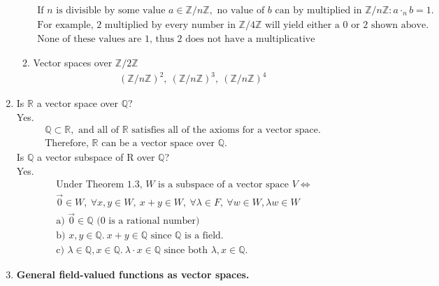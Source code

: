 \documentclass{article}
\begin{document}
\begin{enumerate}
\begin{enumerate}
\begin{gather*}
            \textrm{If } n \textrm{ is divisible by some value } a \in \mathbb{Z}/n\mathbb{Z}, \textrm{ no value of } b \textrm{ can by multiplied in } \mathbb{Z}/n\mathbb{Z} : a \cdot_n b = 1.
        \end{gather*}
        \begin{gather*}
            \textrm{For example, 2 multiplied by every number in } \mathbb{Z}/4\mathbb{Z} \textrm{ will yield either a 0 or 2 shown above.} \\
            \textrm{None of these values are 1, thus 2 does not have a multiplicative inverse.}
        \end{gather*}
        \item Vector spaces over $\mathbb{Z} / 2\mathbb{Z}$
        \begin{gather*}
            (\mathbb{Z}/n\mathbb{Z})^2,\  (\mathbb{Z}/n\mathbb{Z})^3, \ (\mathbb{Z}/n\mathbb{Z})^4
        \end{gather*}
    \end{enumerate}
    \item Is $\mathbb{R}$ a vector space over $\mathbb{Q}$? \\
    Yes.
    \begin{gather*}
        \mathbb{Q} \subset \mathbb{R}, \textrm{ and all of } \mathbb{R} \textrm{ satisfies all of the axioms for a vector space. } \\
        \textrm{Therefore, } \mathbb{R} \textrm{ can be a vector space over } \mathbb{Q}.
    \end{gather*}
    Is $\mathbb{Q}$ a vector subspace of R over $\mathbb{Q}$? \\
    Yes.
    \begin{gather*}
        \textrm{Under Theorem 1.3, $W$ is a subspace of a vector space $V$} \iff \\
        \vec 0 \in W, \ \forall x,y \in W, \ x+y \in W, \ \forall \lambda \in F, \ \forall w \in W, \lambda w \in W \\
        \textrm{a) } \vec 0 \in \mathbb{Q} \textrm{ (0 is a rational number)} \\
        \textrm{b) } x,y \in \mathbb{Q}. \ x + y \in \mathbb{Q} \textrm{ since } \mathbb{Q} \textrm{ is a field.} \\
        \textrm{c) } \lambda \in \mathbb{Q}, x \in \mathbb{Q}. \ \lambda \cdot x \in \mathbb{Q} \textrm{ since both } \lambda, x \in \mathbb{Q}.
    \end{gather*}
    \item \textbf{General field-valued functions as vector spaces.}

\end{enumerate}
\end{document}
